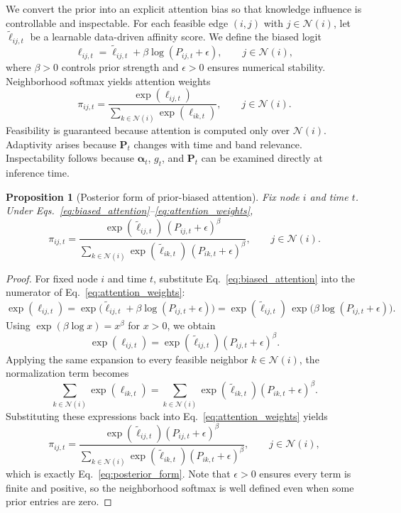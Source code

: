 \documentclass[preprint,12pt]{elsarticle}
\newtheorem{proposition}{Proposition}
\newtheorem{proof}{Proof}
\begin{document}
We convert the prior into an explicit attention bias so that knowledge influence is controllable and inspectable.
For each feasible edge $(i,j)$ with $j\in\mathcal{N}(i)$, let $\tilde{\ell}_{ij,t}$ be a learnable data-driven affinity score.
We define the biased logit
\begin{equation}
\ell_{ij,t}
=
\tilde{\ell}_{ij,t}
+
\beta \log(P_{ij,t}+\epsilon),
\qquad j\in\mathcal{N}(i),
\label{eq:biased_attention}
\end{equation}
where $\beta>0$ controls prior strength and $\epsilon>0$ ensures numerical stability.
Neighborhood softmax yields attention weights
\begin{equation}
\pi_{ij,t}
=
\frac{\exp(\ell_{ij,t})}{\sum_{k\in\mathcal{N}(i)}\exp(\ell_{ik,t})},
\qquad j\in\mathcal{N}(i).
\label{eq:attention_weights}
\end{equation}
Feasibility is guaranteed because attention is computed only over $\mathcal{N}(i)$.
Adaptivity arises because $\mathbf{P}_t$ changes with time and band relevance.
Inspectability follows because $\boldsymbol{\alpha}_t$, $g_t$, and $\mathbf{P}_t$ can be examined directly at inference time.

\begin{proposition}[Posterior form of prior-biased attention]
\label{prop:posterior_form}
Fix node $i$ and time $t$.
Under Eqs.~\eqref{eq:biased_attention}--\eqref{eq:attention_weights},
\begin{equation}
\pi_{ij,t}
=
\frac{\exp(\tilde{\ell}_{ij,t})\,(P_{ij,t}+\epsilon)^{\beta}}
{\sum_{k\in\mathcal{N}(i)}\exp(\tilde{\ell}_{ik,t})\,(P_{ik,t}+\epsilon)^{\beta}},
\qquad j\in\mathcal{N}(i).
\label{eq:posterior_form}
\end{equation}
\end{proposition}

\begin{proof}
For fixed node $i$ and time $t$, substitute Eq.~\eqref{eq:biased_attention} into the numerator of Eq.~\eqref{eq:attention_weights}:
\[
\exp(\ell_{ij,t})
=
\exp\!\bigl(\tilde{\ell}_{ij,t}+\beta\log(P_{ij,t}+\epsilon)\bigr)
=
\exp(\tilde{\ell}_{ij,t})\,\exp\!\bigl(\beta\log(P_{ij,t}+\epsilon)\bigr).
\]
Using $\exp(\beta\log x)=x^\beta$ for $x>0$, we obtain
\[
\exp(\ell_{ij,t})
=
\exp(\tilde{\ell}_{ij,t})(P_{ij,t}+\epsilon)^\beta .
\]
Applying the same expansion to every feasible neighbor $k\in\mathcal{N}(i)$, the normalization term becomes
\[
\sum_{k\in\mathcal{N}(i)}\exp(\ell_{ik,t})
=
\sum_{k\in\mathcal{N}(i)}
\exp(\tilde{\ell}_{ik,t})(P_{ik,t}+\epsilon)^\beta.
\]
Substituting these expressions back into Eq.~\eqref{eq:attention_weights} yields
\[
\pi_{ij,t}
=
\frac{\exp(\tilde{\ell}_{ij,t})(P_{ij,t}+\epsilon)^\beta}
{\sum_{k\in\mathcal{N}(i)}\exp(\tilde{\ell}_{ik,t})(P_{ik,t}+\epsilon)^\beta},
\qquad j\in\mathcal{N}(i),
\]
which is exactly Eq.~\eqref{eq:posterior_form}. Note that $\epsilon>0$ ensures every term is finite and positive, so the neighborhood softmax is well defined even when some prior entries are zero.
\end{proof}
\end{document}
